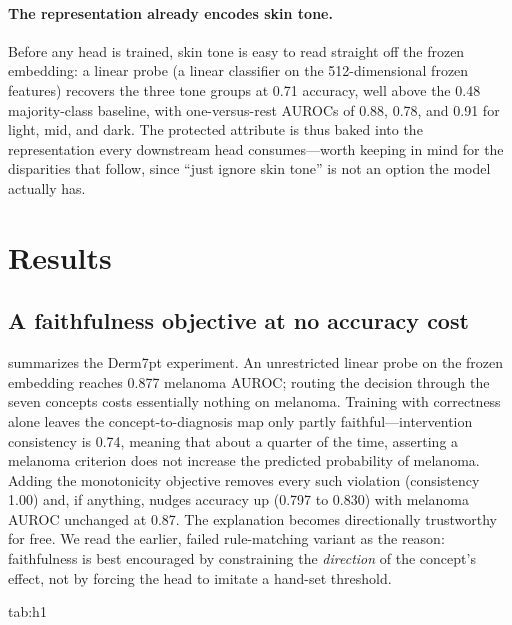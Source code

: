 \documentclass[pmlr,twocolumn,10pt]{jmlr}
\begin{document}
\paragraph{The representation already encodes skin tone.}
Before any head is trained, skin tone is easy to read straight off the frozen
embedding: a linear probe (a linear classifier on the 512-dimensional frozen
features) recovers the three tone groups at 0.71 accuracy, well above the 0.48
majority-class baseline, with one-versus-rest AUROCs of 0.88, 0.78, and 0.91 for
light, mid, and dark. The protected attribute is thus baked into the
representation every downstream head consumes---worth keeping in mind for the
disparities that follow, since ``just ignore skin tone'' is not an option the
model actually has.

\section{Results}

\subsection{A faithfulness objective at no accuracy cost}
\label{sec:h1}

 summarizes the Derm7pt experiment. An unrestricted linear
probe on the frozen embedding reaches 0.877 melanoma AUROC; routing the decision
through the seven concepts costs essentially nothing on melanoma. Training with
correctness alone leaves the concept-to-diagnosis map only partly
faithful---intervention consistency is 0.74, meaning that about a quarter of the
time, asserting a melanoma criterion does not increase the predicted
probability of melanoma. Adding the monotonicity objective removes every such
violation (consistency 1.00) and, if anything, nudges accuracy up (0.797 to
0.830) with melanoma AUROC unchanged at 0.87. The explanation becomes
directionally trustworthy for free. We read the earlier, failed rule-matching
variant as the reason: faithfulness is best encouraged by constraining the
\emph{direction} of the concept's effect, not by forcing the head to imitate a
hand-set threshold.

\begin{table}[htbp]
\floatconts
  {tab:h1}
  {\caption{Faithfulness on Derm7pt (5-class head, 3 seeds). Adding the
  monotonicity objective makes the concept$\rightarrow$diagnosis map perfectly
  intervention-consistent at no cost to accuracy or melanoma AUROC.}}
  {\small\setlength{\tabcolsep}{4pt}%
  }
\end{table}
\end{document}
